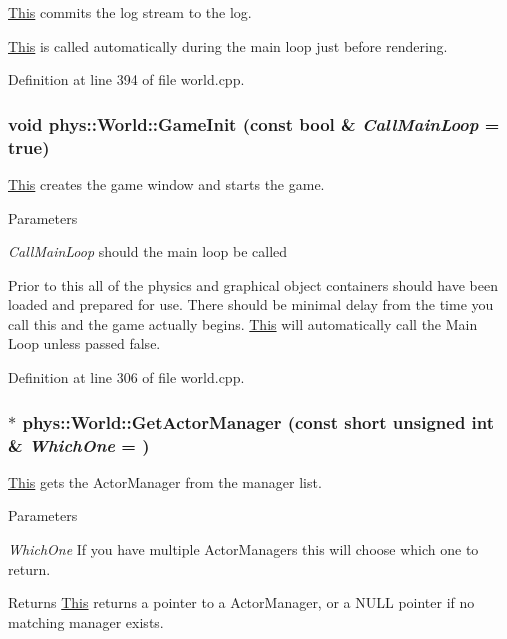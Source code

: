 \hyperlink{structThis}{This} commits the log stream to the log. 

\hyperlink{structThis}{This} is called automatically during the main loop just before rendering. 

Definition at line 394 of file world.cpp.

\hypertarget{classphys_1_1World_a21cc36be08a61f40619584d4c438936b}{
\subsubsection[{GameInit}]{\setlength{\rightskip}{0pt plus 5cm}void phys::World::GameInit (const bool \& {\em CallMainLoop} = {\ttfamily true})}}
\label{da/ddf/classphys_1_1World_a21cc36be08a61f40619584d4c438936b}


\hyperlink{structThis}{This} creates the game window and starts the game. 


\begin{DoxyParams}{Parameters}
\item[{\em CallMainLoop}]should the main loop be called\end{DoxyParams}
Prior to this all of the physics and graphical object containers should have been loaded and prepared for use. There should be minimal delay from the time you call this and the game actually begins. \hyperlink{structThis}{This} will automatically call the Main Loop unless passed false. 

Definition at line 306 of file world.cpp.

\hypertarget{classphys_1_1World_a8173d8959802e923f4972822435e43b6}{
\subsubsection[{GetActorManager}]{ $\ast$ phys::World::GetActorManager (const short unsigned int \& {\em WhichOne} = {})}}
\label{da/ddf/classphys_1_1World_a8173d8959802e923f4972822435e43b6}


\hyperlink{structThis}{This} gets the ActorManager from the manager list. 


\begin{DoxyParams}{Parameters}
\item[{\em WhichOne}]If you have multiple ActorManagers this will choose which one to return. \end{DoxyParams}
\begin{DoxyReturn}{Returns}
\hyperlink{structThis}{This} returns a pointer to a ActorManager, or a NULL pointer if no matching manager exists. 
\end{DoxyReturn}


